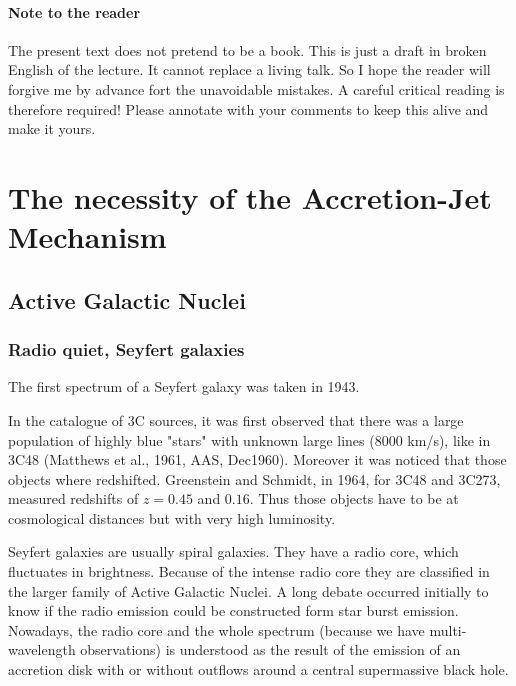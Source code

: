 \documentclass[10pt,a4paper,english,draft]{article}
\begin{document}

\paragraph{Note to the reader}
The present text does not pretend to be a book. This is just a draft in broken
English of the lecture. It cannot replace a living talk. So I hope the reader
will forgive me by advance fort the unavoidable mistakes. A careful critical
reading is therefore required! Please annotate with your comments to keep this
alive and make it yours.

\tableofcontents

\newpage
{} %


\section{The necessity of the Accretion-Jet Mechanism}

\subsection{Active Galactic Nuclei}

\subsubsection{Radio quiet, Seyfert galaxies}

The first spectrum of a Seyfert galaxy was taken in 1943.

In the catalogue of 3C sources, it was first observed that there was a large
population of highly blue "stars" with unknown large lines (8000 km/s), like in
3C48 (Matthews et al., 1961, AAS, Dec1960). Moreover it was noticed that those
objects where redshifted. Greenstein and Schmidt, in 1964, for 3C48 and 3C273,
measured redshifts of $z=0.45$ and $0.16$. Thus those objects have to be at
cosmological distances but with very high luminosity.

Seyfert galaxies are usually spiral galaxies. They have a radio core, which
fluctuates in brightness. Because of the intense radio core they are classified
in the larger family of Active Galactic Nuclei. A long debate occurred
initially to know if the radio emission could be constructed form star burst
emission. Nowadays, the radio core and the whole spectrum (because we have
multi-wavelength observations) is understood as the result of the emission of
an accretion disk with or without outflows around a central supermassive black
hole.
\end{document}
